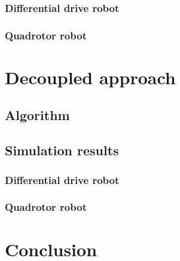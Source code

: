 \subsubsection{Differential drive robot}
\subsubsection{Quadrotor robot}

\section{Decoupled approach}
\subsection{Algorithm}
\subsection{Simulation results}
\subsubsection{Differential drive robot}
\subsubsection{Quadrotor robot}

\section{Conclusion}

\todomarker{}